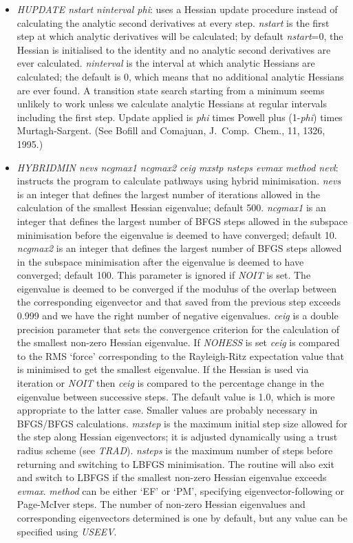 \documentclass[12pt,a4paper,dvips]{article}
\begin{document}
\begin{itemize}
\item {\it HUPDATE nstart ninterval phi\/}: uses a Hessian update 
procedure instead
of calculating the analytic second derivatives at every step. 
{\it nstart\/} is the first step at which analytic derivatives will be calculated; by
default {\it nstart\/}=0, the Hessian is initialised to the identity and no
analytic second derivatives are ever calculated. {\it ninterval\/} is the interval
at which analytic Hessians are calculated; the default is 0, which means that no
additional analytic Hessians are ever found. A transition state search starting from
a minimum seems unlikely to work unless we calculate analytic Hessians at regular
intervals including the first step. Update applied is
{\it phi\/} times Powell\cite{powell71} plus (1-{\it phi}) times Murtagh-Sargent.
(See Bofill and Comajuan, J.~Comp.~Chem., 11, 1326, 1995.)


\item {\it HYBRIDMIN\/ nevs ncgmax1 ncgmax2 ceig mxstp nsteps evmax method nevl}: instructs the 
program to calculate pathways using hybrid minimisation.
{\it nevs\/} is an integer that defines the largest number of iterations allowed in the
calculation of the smallest Hessian eigenvalue; default 500.
{\it ncgmax1\/} is an integer that defines the largest number of BFGS steps
allowed in the subspace minimisation before the eigenvalue is deemed to have converged; default 10.
{\it ncgmax2\/} is an integer that defines the largest number of BFGS steps
allowed in the subspace minimisation after the eigenvalue is deemed to have converged; default 100.
This parameter is ignored if {\it NOIT\/} is set.
The eigenvalue is deemed to be converged if the modulus of the overlap between the corresponding
eigenvector and that saved from the previous step exceeds 0.999 and we have the right number of
negative eigenvalues.
{\it ceig\/} is a double precision parameter that sets the convergence criterion for
the calculation of the smallest non-zero Hessian eigenvalue.
If {\it NOHESS\/} is set {\it ceig\/} is compared to the RMS `force' corresponding to the
Rayleigh-Ritz expectation value that is minimised to get the smallest eigenvalue.
If the Hessian is used via iteration or {\it NOIT\/}
then {\it ceig\/} is compared to the percentage change in the eigenvalue between successive
steps. The default value is 1.0, which is more appropriate to the latter case. Smaller
values are probably necessary in BFGS/BFGS calculations.
{\it mxstep\/} is the maximum initial step size allowed for the step along
Hessian eigenvectors; it is adjusted dynamically using a trust radius scheme (see {\it TRAD\/}).
{\it nsteps\/} is the maximum number of steps before returning and switching to LBFGS
minimisation. 
The routine will also exit and switch to LBFGS if the smallest non-zero Hessian
eigenvalue exceeds {\it evmax\/}.
{\it method\/} can be either `EF' or `PM', specifying eigenvector-following or
Page-McIver steps.
The number of non-zero Hessian eigenvalues and corresponding eigenvectors determined
is one by default, but any value can be specified using {\it USEEV\/}.


\end{itemize}
\end{document}
